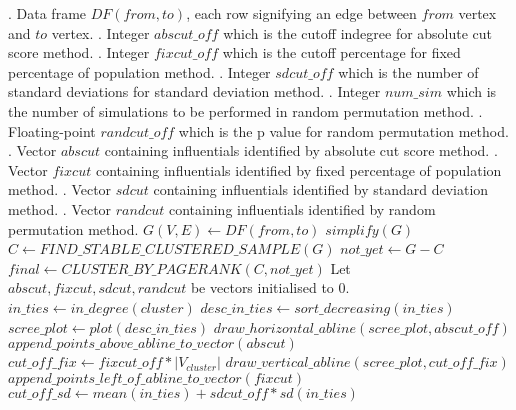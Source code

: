 \documentclass[a4paper]{article}
\begin{document}
\begin{algorithm}
\begin{algorithmic}[1]
\INPUT
    . Data frame $DF(from, to)$, each row signifying an edge between $from$ vertex and $to$ vertex.
    . Integer $abscut\_off$ which is the cutoff indegree for absolute cut score method.
    . Integer $fixcut\_off$ which is the cutoff percentage for fixed percentage of population method.
    . Integer $sdcut\_off$ which is the number of standard deviations for standard deviation method.
    . Integer $num\_sim$ which is the number of simulations to be performed in random permutation method.
    . Floating-point $randcut\_off$ which is the p value for random permutation method. 
\OUTPUT
    . Vector $abscut$ containing influentials identified by absolute cut score method.
    . Vector $fixcut$ containing influentials identified by fixed percentage of population method.
    . Vector $sdcut$ containing influentials identified by standard deviation method.
    . Vector $randcut$ containing influentials identified by random permutation method.
\Statex
{} 
    \State $G(V, E) \gets DF(from, to)$
    \State $simplify(G)$
    \State $C \gets FIND\_STABLE\_CLUSTERED\_SAMPLE(G)$
    \State $not\_yet \gets G - C$
    \State $final \gets CLUSTER\_BY\_PAGERANK(C, not\_yet)$
    \State Let $abscut, fixcut, sdcut, randcut$ be vectors initialised to $0$.
        \State $in\_ties \gets in\_degree(cluster)$
        \State $desc\_in\_ties \gets sort\_decreasing(in\_ties)$
        \State $scree\_plot \gets plot(desc\_in\_ties)$
        \State $draw\_horizontal\_abline(scree\_plot, abscut\_off)$
        \State $append\_points\_above\_abline\_to\_vector(abscut)$
        \State $cut\_off\_fix \gets fixcut\_off * |V_{cluster}|$
        \State $draw\_vertical\_abline(scree\_plot, cut\_off\_fix)$
        \State $append\_points\_left\_of\_abline\_to\_vector(fixcut)$
        \State $cut\_off\_sd \gets mean(in\_ties) + sdcut\_off * sd(in\_ties)$

\end{algorithmic}
\end{algorithm}
\end{document}
